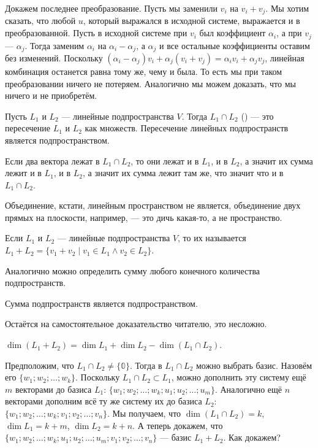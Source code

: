 \documentclass{article}
\begin{document}
\begin{itemize}
\begin{Proof}
            Докажем последнее преобразование. Пусть мы заменили $v_i$ на $v_i+v_j$. Мы хотим сказать, что любой $u$, который выражался в исходной системе, выражается и в преобразованной. Пусть в исходной системе при $v_i$ был коэффициент $\alpha_i$, а при $v_j$ --- $\alpha_j$. Тогда заменим $\alpha_i$ на $\alpha_i-\alpha_j$, а $\alpha_j$ и все остальные коэффициенты оставим без изменений. Поскольку $(\alpha_i-\alpha_j)v_i+\alpha_j(v_i+v_j)=\alpha_iv_i+\alpha_jv_j$, линейная комбинация останется равна тому же, чему и была. То есть мы при таком преобразовании ничего не потеряем. Аналогично мы можем доказать, что мы ничего и не приобретём.
        \end{Proof}
        \dfn Пусть $L_1$ и $L_2$ --- линейные подпространства $V$. Тогда $L_1\cap L_2$ () --- это пересечение $L_1$ и $L_2$ как множеств.
        \thm Пересечение линейных подпространств является подпространством.
        \pagebreak
        \begin{Proof}
            Если два вектора лежат в $L_1\cap L_2$, то они лежат и в $L_1$, и в $L_2$, а значит их сумма лежит и в $L_1$, и в $L_2$, а значит их сумма лежит там же, что значит что и в $L_1\cap L_2$.
        \end{Proof}
        \begin{Comment}
            Объединение, кстати, линейным пространством не является, объединение двух прямых на плоскости, например, --- это дичь какая-то, а не пространство.
        \end{Comment}
        \dfn Если $L_1$ и $L_2$ --- линейные подпространства $V$, то их  называется $L_1+L_2=\{v_1+v_2\mid v_1\in L_1\land v_2\in L_2\}$.
        \begin{Comment}
            Аналогично можно определить сумму любого конечного количества подпространств.
        \end{Comment}
        \thm Сумма подпространств является подпространством.
        \begin{Proof}
            Остаётся на самостоятельное доказательство читателю, это несложно.
        \end{Proof}
        \thm $\dim(L_1+L_2)=\dim L_1+\dim L_2-\dim(L_1\cap L_2)$.
        \begin{Proof}
            Предположим, что $L_1\cap L_2\neq\{\mathbb0\}$. Тогда в $L_1\cap L_2$ можно выбрать базис. Назовём его $\{w_1;w_2;\ldots;w_k\}$. Поскольку $L_1\cap L_2\subset L_1$, можно дополнить эту систему ещё $m$ векторами до базиса $L_1$: $\{w_1;w_2;\ldots;w_k;u_1;u_2;\ldots;u_m\}$. Аналогично ещё $n$ векторами дополним всё ту же систему их до базиса $L_2$: $\{w_1;w_2;\ldots;w_k;v_1;v_2;\ldots;v_n\}$. Мы получаем, что $\dim(L_1\cap L_2)=k$, $\dim L_1=k+m$, $\dim L_2=k+n$. А теперь докажем, что $\{w_1;w_2;\ldots;w_k;u_1;u_2;\ldots;u_m;v_1;v_2;\ldots;v_n\}$ --- базис $L_1+L_2$. Как докажем?\\

\end{Proof}
\end{itemize}
\end{document}
